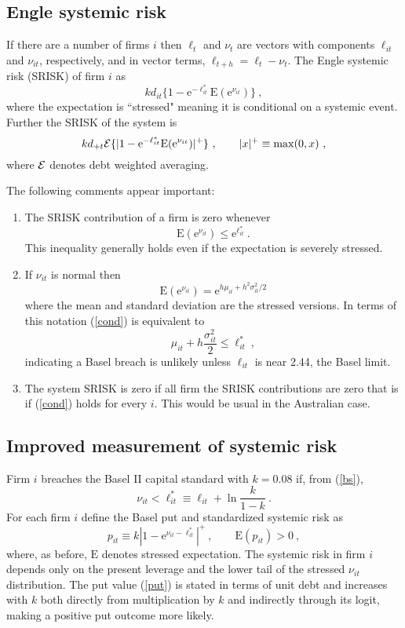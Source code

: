 \documentclass[authoryear]{elsarticle}
\newcommand{\E}{\mathrm{E}}
\newcommand{\e}{\mathrm{e}}
\newcommand{\Ex}{{\cal E}}
\newcommand{\eref}[1]{(\ref{#1})}
\newcommand{\cq}{\ , \qquad}
\newcommand{\be}[1]{\begin{equation}\label{#1}}
\newcommand{\ee}{\end{equation}}
\begin{document}
\subsection{Engle systemic risk}
If there are a number of  firms $i$ then $\ell_t$ and $\nu_t$ are  vectors with components $\ell_{it}$ and $\nu_{it}$, respectively, and in vector terms, $\ell_{t+h}=\ell_t - \nu_t$.   The Engle systemic risk (SRISK) of  firm $i$ as 
\be{esrisk}
 kd_{it}\{1-\e^{-\ell^*_{it}}\E(\e^{\nu_{it}})\}\ ,
\ee
where the expectation is ``stressed" meaning it is conditional on a systemic event.  Further the SRISK of the system is
\be{essrisk}
kd_{+t}\Ex\{|1-\e^{-\ell^*_{it}}\E(\e^{\nu_{it}})|^+\}\cq |x|^+\equiv \max(0,x) \ ,
\ee
where $\Ex$ denotes debt weighted averaging.

The following comments appear important:
\begin{enumerate}
\item The SRISK contribution of a firm is zero whenever
\be{cond}
\E(\e^{\nu_{it}})\le\e^{\ell^*_{it}}\ .
\ee
This inequality generally holds even if the expectation is severely stressed. 
\item  If $\nu_{it}$ is normal then 
$$
\E(\e^{\nu_{it}}) = \e^{h\mu_{it} +h^2\sigma^2_{it}/2}
$$
where the mean and standard deviation are the stressed versions.  In terms of this notation \eref{cond}
is equivalent to
$$
\mu_{it} +h\frac{\sigma^2_{it}}{2}\le \ell_{it}^* \ ,
$$
indicating a Basel breach is unlikely unless $\ell_{it}$ is near 2.44, the Basel limit.

\item The system SRISK is zero if all firm the SRISK contributions are zero that is if \eref{cond} holds for every $i$.  This would be usual in the Australian case.
\end{enumerate}

\subsection{Improved measurement of systemic risk}

Firm $i$ breaches the Basel II capital standard with $k=0.08$ if, from \eref{bs},
$$
\nu_{it}< \ell_{it}^*\equiv \ell_{it}+\ln\frac{k}{1-k}  \ .
$$
For each firm $i$ define the  Basel put and standardized systemic risk as 
\be{put}
p_{it}\equiv k |1-\e^{\nu_{it}-\ell^*_{it}}|^+\cq \E(p_{it})>0\ ,
\ee
where, as before, $\E$ denotes stressed expectation.  The systemic risk in firm $i$ depends only on the present leverage  and the lower tail of the stressed $\nu_{it}$ distribution.  The put value \eref{put} is stated in terms of unit debt and increases with $k$ both directly from  multiplication by $k$ and indirectly through its logit, making a positive put outcome more likely.  
\end{document}
